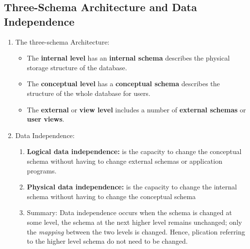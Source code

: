 \documentclass[10pt]{article}
\newcommand{\tf}{\textbf}
\newcommand{\ti}{\textit}
\begin{document}
\subsection{Three-Schema Architecture and Data Independence}
\begin{enumerate}
	\item The three-schema Architecture: \\
	

	\begin{itemize}
		\item The \tf{internal level} has an \tf{internal schema} describes the physical storage structure of the database.
		\item The \tf{conceptual level} has a \tf{conceptual schema} describes the structure of the whole database for users.
		\item The \tf{external} or \tf{view level} includes a number of \tf{external schemas} or \tf{user views}.
	\end{itemize}

	\item Data Independence: 
	\begin{enumerate}
		\item \tf{Logical data independence:} is the capacity to change the conceptual schema without having to change external schemas or application programs.
		\item \tf{Physical data independence:} is the capacity to change the internal schema without having to change the conceptual schema
		\item Summary: Data independence occurs when the schema is changed at some level, the schema at the next higher level remains unchanged; only the \ti{mapping} between the two levels is changed. Hence, plication referring to the higher level schema do not need to be changed.

		\bigbreak
		\bigbreak 
	\end{enumerate}
\end{enumerate}
\end{document}
